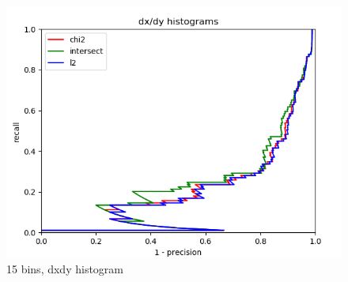 \documentclass{article}
\begin{document}
\begin{figure}[ht]
\begin{minipage}{.5\textwidth}
        \includegraphics[width=\linewidth]{images/Q4.b-dxdy_histogram_15_bins.png}
        \caption{15 bins, dxdy histogram}
    \end{minipage}
\end{figure}
\end{document}
